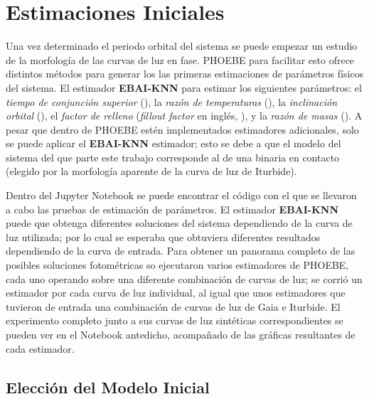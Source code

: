 \section{Estimaciones Iniciales}
\label{metodologia:modelocomputacional:estimacionesiniciales}

Una vez determinado el periodo orbital del sistema se puede empezar un estudio
de la morfología de las curvas de luz en fase. PHOEBE para facilitar esto ofrece
distintos métodos para generar los las primeras estimaciones de parámetros
físicos del sistema. El estimador \textbf{EBAI-KNN} para estimar los siguientes
parámetros: el \textit{tiempo de conjunción superior} (), la
\textit{razón de temperaturas} (), la \textit{inclinación
	orbital} (), el \textit{factor de relleno}
(\textit{fillout factor} en inglés, ), y la
\textit{razón de masas} (). A pesar que dentro de PHOEBE estén
implementados estimadores adicionales, solo se puede aplicar el
\textbf{EBAI-KNN} estimador; esto se debe a que el modelo del sistema del que
parte este trabajo corresponde al de una binaria en contacto (elegido por la
morfología aparente de la curva de luz de Iturbide).

Dentro del Jupyter Notebook
\href{https://github.com/KnightIV/UANL_MAPTA_PlanObservaciones/blob/main/analisis/phoebe_model/estimations/ebai-default.ipynb}{}
se puede encontrar el código con el que se llevaron a cabo las pruebas de
estimación de parámetros. El estimador \textbf{EBAI-KNN} puede que obtenga
diferentes soluciones del sistema dependiendo de la curva de luz utilizada; por
lo cual se esperaba que obtuviera diferentes resultados dependiendo de la curva
de entrada. Para obtener un panorama completo de las posibles soluciones
fotométricas so ejecutaron varios estimadores de PHOEBE, cada uno operando sobre
una diferente combinación de curvas de luz; se corrió un estimador por cada
curva de luz individual, al igual que unos estimadores que tuvieron de entrada
una combinación de curvas de luz de Gaia e Iturbide. El experimento completo
junto a sus curvas de luz sintéticas correspondientes se pueden ver en el
Notebook antedicho, acompañado de las gráficas resultantes de cada estimador.

\subsection{Elección del Modelo Inicial}
\label{metodologia:modelocomputacional:estimacionesiniciales:eligiendomodeloinicial}

